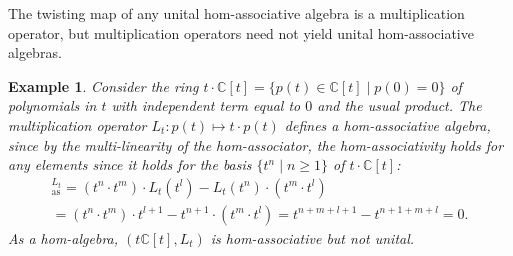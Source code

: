 \documentclass[12pt]{article}
\newtheorem{example}[theorem]{Example}
\begin{document}
		\begin{table}[H]
		\end{table}
		
		The twisting map of any unital hom-associative algebra is a multiplication operator, but multiplication operators need not yield unital hom-associative algebras.
		
		\begin{example}\label{ex:counter-poly}
			Consider the ring $t\cdot \mathbb{C}[t]=\{p(t)\in \mathbb{C}[t]\mid p(0)=0\}$ of polynomials in $t$ with independent term equal to $0$ and the usual product. The multiplication operator $L_t\colon p(t)\mapsto t\cdot p(t)$ defines a hom-associative algebra, since by the multi-linearity of the hom-associator, the hom-associativity holds for any elements since it holds for the basis $\{t^n\mid n\ge 1\}$ of $t\cdot \mathbb{C}[t]$:
			\begin{multline*}
				[t^n,t^m,t^l]_{\mathrm{as}}^{L_t}=(t^n\cdot t^m)\cdot L_t(t^l)-L_t(t^n)\cdot (t^m\cdot t^l)\\=(t^n\cdot t^m)\cdot t^{l+1}-t^{n+1}\cdot (t^m\cdot t^l)=t^{n+m+l+1}-t^{n+1+m+l}=0.
			\end{multline*}
			As a hom-algebra, $(t\mathbb{C}[t],L_t)$ is hom-associative but not unital.
		\end{example}
		
\end{document}
